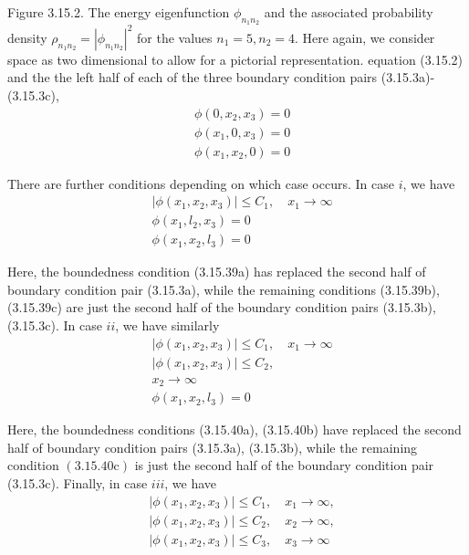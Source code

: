 \documentclass{article}
\begin{document}
Figure 3.15.2. The energy eigenfunction $\phi_{n_{1} n_{2}}$ and the associated probability density $\rho_{n_{1} n_{2}}=\left|\phi_{n_{1} n_{2}}\right|^{2}$ for the values $n_{1}=5, n_{2}=4$. Here again, we consider space as two dimensional to allow for a pictorial representation.
equation (3.15.2) and the the left half of each of the three boundary condition pairs (3.15.3a)-(3.15.3c),
$$
\begin{align*}
& \phi\left(0, x_{2}, x_{3}\right)=0  \tag{3.15.38a}\\
& \phi\left(x_{1}, 0, x_{3}\right)=0  \tag{3.15.38b}\\
& \phi\left(x_{1}, x_{2}, 0\right)=0 \tag{3.15.38c}
\end{align*}
$$

There are further conditions depending on which case occurs. In case $i$, we have
$$
\begin{align*}
& \left|\phi\left(x_{1}, x_{2}, x_{3}\right)\right| \leq C_{1}, \quad x_{1} \rightarrow \infty  \tag{3.15.39a}\\
& \phi\left(x_{1}, l_{2}, x_{3}\right)=0  \tag{3.15.39b}\\
& \phi\left(x_{1}, x_{2}, l_{3}\right)=0 \tag{3.15.39c}
\end{align*}
$$

Here, the boundedness condition (3.15.39a) has replaced the second half of boundary condition pair (3.15.3a), while the remaining conditions (3.15.39b), (3.15.39c) are just the second half of the boundary condition pairs (3.15.3b), (3.15.3c). In case $i i$, we have similarly
$$
\begin{align*}
& \left|\phi\left(x_{1}, x_{2}, x_{3}\right)\right| \leq C_{1}, \quad x_{1} \rightarrow \infty  \tag{3.15.40a}\\
& \left|\phi\left(x_{1}, x_{2}, x_{3}\right)\right| \leq C_{2},  \tag{3.15.40b}\\
& x_{2} \rightarrow \infty  \tag{3.15.40c}\\
& \phi\left(x_{1}, x_{2}, l_{3}\right)=0
\end{align*}
$$

Here, the boundedness conditions (3.15.40a), (3.15.40b) have replaced the second half of boundary condition pairs (3.15.3a), (3.15.3b), while the remaining condition $(3.15 .40 \mathrm{c})$ is just the second half of the boundary condition pair (3.15.3c). Finally, in case $i i i$, we have
$$
\begin{align*}
& \left|\phi\left(x_{1}, x_{2}, x_{3}\right)\right| \leq C_{1}, \quad x_{1} \rightarrow \infty,  \tag{3.15.41a}\\
& \left|\phi\left(x_{1}, x_{2}, x_{3}\right)\right| \leq C_{2}, \quad x_{2} \rightarrow \infty,  \tag{3.15.41b}\\
& \left|\phi\left(x_{1}, x_{2}, x_{3}\right)\right| \leq C_{3}, \quad x_{3} \rightarrow \infty \tag{3.15.41c}
\end{align*}
$$
\end{document}
